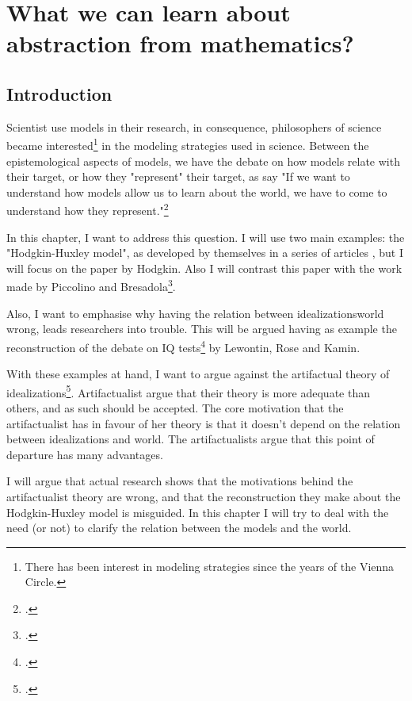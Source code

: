 
\chapter{What we can learn about abstraction from mathematics?}

\section{Introduction}

Scientist use models in their research, in consequence, philosophers of science became interested\footnote{There has been interest in modeling strategies since the years of the Vienna Circle.} in the modeling strategies used in science.
Between the epistemological aspects of models, we have the debate on how models relate with their target, or how they "represent" their target, as \citeauthor{Frigg2020} say "If we want to understand how models allow us to learn about the world, we have to come to understand how they represent."\footcite[][p. x]{Frigg2020}

In this chapter, I want to address this question.
I will use two main examples: the "Hodgkin-Huxley model", as developed by themselves in a series of articles \parencite{Hodgkin1951, Hodgkin1952, Hodgkin1952a, Hodgkin1952b}, but I will focus on the paper  by Hodgkin.
Also I will contrast this paper with the work made by Piccolino and Bresadola\footcite{Piccolino2013}.

Also, I want to emphasise why having the relation between idealizations\/world wrong, leads researchers into trouble.
This will be argued having as example the reconstruction of the debate on IQ tests\footcite{Lewontin2017} by Lewontin, Rose and Kamin.

With these examples at hand, I want to argue against the artifactual theory of idealizations\footcite{Carrillo2021-CARAAP-12, Carrillo2022}.
Artifactualist argue that their theory is more adequate than others, and as such should be accepted.
The core motivation that the artifactualist has in favour of her theory is that it doesn't depend on the relation between idealizations and world.
The artifactualists argue that this point of departure has many advantages.

I will argue that actual research shows that the motivations behind the artifactualist theory are wrong, and that the reconstruction they make about the Hodgkin-Huxley model is misguided.
In this chapter I will try to deal with the need (or not) to clarify the relation between the models and the world.

